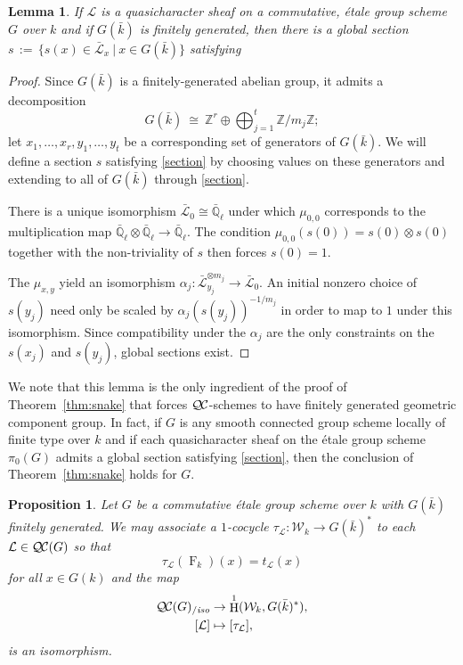 \documentclass[11pt]{amsart}
\theoremstyle{plain}
\newtheorem{proposition}[theorem]{Proposition}
\newtheorem{lemma}[theorem]{Lemma}
\theoremstyle{definition}
\theoremstyle{remark}
\newcommand{\ZZ}{{\mathbb{Z}}}
\newcommand{\EE}{\mathbb{\bar Q}_\ell}
\newcommand{\bFq}{\bar{k}}
\newcommand{\Fq}{k}
\newcommand{\Frob}[1]{\operatorname{F}_{#1}}
\DeclareMathOperator{\Hh}{H}
\newcommand{\ceq}{{\, :=\, }}
\newcommand{\tq}{{\ \vert\ }}
\newcommand{\iso}{{\ \cong\ }}
\newcommand{\qcs}[1]{{\mathcal{#1}}}
\newcommand{\gqcs}[1]{{\mathcal{\bar #1}}}
\newcommand{\QC}{{\mathcal{Q\hskip-0.8pt C}}}
\newcommand{\QCiso}[1]{\QC(#1)_{/\textit{iso}}}
\newcommand{\Weil}[1]{\mathcal{W}_{#1}}
\newcommand{\trFrob}[1]{t_{#1}}
\begin{document}
\begin{lemma}\label{lemma:section}
 If $\qcs{L}$ is a quasicharacter sheaf on a commutative, \'etale group scheme $G$
 over $\Fq$ and if $G(\bFq)$ is finitely generated, then there is a global section
 $s \ceq \{ s(x) \in \gqcs{L}_x \tq x \in G(\bFq) \}$ satisfying
 \begin{equation}\label{section}
 \end{equation}
\end{lemma}

\begin{proof}
  Since $G(\bFq)$ is a finitely-generated abelian group, it admits a decomposition
  \[
  G(\bFq) \iso \ZZ^r \oplus \bigoplus_{j=1}^t \ZZ / m_j \ZZ;
  \]
  let $x_1, \ldots, x_r, y_1, \ldots, y_t$ be a corresponding set of generators of $G(\bFq)$.
  We will define a section $s$ satisfying \eqref{section} by choosing values on these generators and extending to all
  of $G(\bFq)$ through \eqref{section}.
  
  There is a unique isomorphism $\gqcs{L}_0 \cong \EE$ under which $\mu_{0,0}$ corresponds
  to the multiplication map $\EE \otimes\EE \to \EE$.
  The condition $\mu_{0,0}(s(0)) = s(0) \otimes s(0)$ together with the non-triviality of $s$
  then forces $s(0) = 1$.
  
  The $\mu_{x,y}$ yield an isomorphism $\alpha_j : \gqcs{L}_{y_j}^{\otimes m_j} \to \gqcs{L}_0$.
  An initial nonzero choice of $s(y_j)$ need only be scaled by $\alpha_j(s(y_j))^{-1/m_j}$ in order to map to
  $1$ under this isomorphism.  Since compatibility under the $\alpha_j$ are the only constraints on the
  $s(x_j)$ and $s(y_j)$, global sections exist.
\end{proof}

We note that this lemma is the only ingredient of the proof of Theorem~\ref{thm:snake}
that forces $\QC$-schemes to have finitely generated geometric component group.  In fact,
if $G$ is any smooth connected group scheme locally of finite type over $\Fq$
and if each quasicharacter sheaf on the \'etale group scheme $\pi_0(G)$ admits a global section 
satisfying \eqref{section}, then the conclusion of Theorem~\ref{thm:snake} holds for $G$.

\begin{proposition}\label{prop:etale}
  Let $G$ be a commutative \'etale group scheme over $\Fq$ with $G(\bFq)$ finitely generated.
  We may associate a $1$-cocycle $\tau_\qcs{L}: \Weil{\Fq}\to G(\bFq)^*$ to each $\qcs{L} \in \QC(G)$
  so that
  \[
  \tau_\qcs{L}(\Frob{\Fq})(x) = \trFrob{\qcs{L}}(x)
  \]
  for all $x \in G(\Fq)$ and the map
  \begin{align*}
  \QCiso{G} &\to \Hh^1(\Weil{\Fq}, G(\bFq)^*), \\
  [\qcs{L}] &\mapsto [\tau_\qcs{L}],
  \end{align*}
  is an isomorphism.
\end{proposition}
\end{document}
